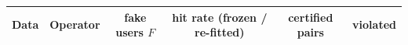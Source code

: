 \begin{tabular}{llcccc}
\toprule
Data & Operator & fake users $F$ & hit rate (frozen / re-fitted) & certified pairs & violated\\
\midrule
\bottomrule
\end{tabular}
